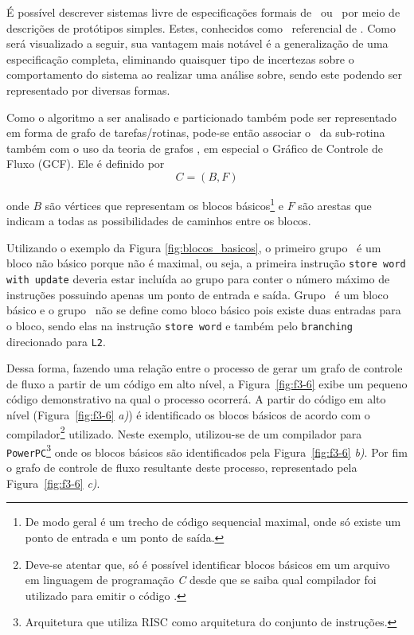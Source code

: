       É possível descrever sistemas livre de especificações formais de \software\ ou \hardware\ por meio de descrições de protótipos simples.
      Estes, conhecidos como \design\ referencial de \software.
      Como será visualizado a seguir, sua vantagem mais notável é a generalização de uma especificação completa, eliminando quaisquer tipo de incertezas sobre o comportamento do sistema ao realizar uma análise sobre, sendo este podendo ser representado por diversas formas.

      Como o algoritmo a ser analisado e particionado também pode ser representado em forma de grafo de tarefas/rotinas, pode-se então associar o \design\ da sub-rotina também com o uso da teoria de grafos \citep{Mann2007}, em especial o Gráfico de Controle de Fluxo (GCF).
      Ele é definido por
      \begin{equation}
         C = (B, F) \label{eq:subrotina}
      \end{equation}

       onde $B$ são vértices que representam os blocos básicos\footnote{De modo geral é um trecho de código sequencial maximal, onde só existe um ponto de entrada e um ponto de saída.}
      e $ F $ são arestas que indicam a todas as possibilidades de caminhos entre os blocos.

      Utilizando o exemplo da Figura \ref{fig:blocos_basicos}, o primeiro grupo \A\ é um bloco não básico porque não é maximal, ou seja, a primeira instrução \texttt{store word with update} deveria estar incluída ao grupo para conter o número máximo de instruções possuindo apenas um ponto de entrada e saída.
      Grupo \B\ é um bloco básico e o grupo \C\ não se define como bloco básico pois existe duas entradas para o bloco, sendo elas na instrução \texttt{store word} e também pelo \texttt{branching} direcionado para \texttt{L2}.

      Dessa forma, fazendo uma relação entre o processo de gerar um grafo de controle de fluxo a partir de um código em alto nível, a Figura~\ref{fig:f3-6} exibe um pequeno código demonstrativo na qual o processo ocorrerá.
      A partir do código em alto nível (Figura~\ref{fig:f3-6} \textit{a)}) é identificado os blocos básicos de acordo com o compilador\footnote{Deve-se atentar que, só é possível identificar blocos básicos em um arquivo em linguagem de programação \textit{C} desde que se saiba qual compilador foi utilizado para emitir o código \assembly.} utilizado.
      Neste exemplo, utilizou-se de um compilador para \texttt{PowerPC}\footnote{Arquitetura que utiliza RISC como arquitetura do conjunto de instruções.} onde os blocos básicos são identificados pela Figura~\ref{fig:f3-6} \textit{b)}.
      Por fim o grafo de controle de fluxo resultante deste processo, representado pela Figura~\ref{fig:f3-6} \textit{c)}.


